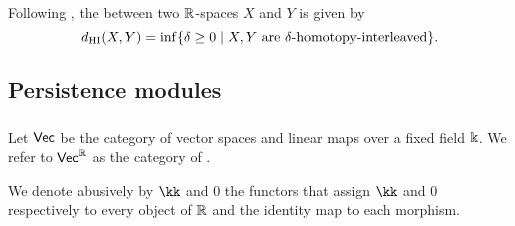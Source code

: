 Following \cite{blumberg2023interleaving}, the  between two $\R$-spaces $X$ and $Y$ is given by
\[
\dhi(X,Y) = \inf \set{\delta \geq 0 \mid X,Y \text{ are }\delta\text{-homotopy-interleaved}}.
\]

\subsection{Persistence modules}

\subsubsection{}

Let $\Vec$ be the category of vector spaces and linear maps over a fixed field $\k$.
We refer to $\Vec^\R$ as the category of .


We denote abusively by $\kk$ and $0$ the functors that assign $\kk$ and $0$ respectively to every object of $\R$ and the identity map to each morphism.


\subsubsection{}

